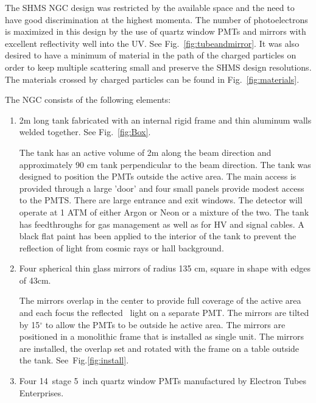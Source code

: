 {The SHMS NGC design was restricted by the available space and the need
to have good discrimination at the highest momenta.  The number of
photoelectrons is maximized in this design by the use of quartz window
PMTs and mirrors with excellent reflectivity well into the UV. See
Fig.~\ref{fig:tubeandmirror}. It was also desired to have a minimum of
material in the path of the charged particles on order to keep
multiple scattering small and preserve the SHMS design
resolutions. The materials crossed by charged particles can be found
in Fig.~\ref{fig:materials}.

\newpage
\vspace{.25in}
\vspace{.25in}

The NGC consists of the following elements:
\begin{enumerate}
\item 2m long tank fabricated with an internal rigid frame and thin
  aluminum walls welded together. See Fig.~\ref{fig:Box}.

 The tank has an active volume of 2m along the beam direction and
 approximately 90 cm tank perpendicular to the beam direction. The
 tank was designed to position the PMTs outside the active area. The
 main access is provided through a large 'door' and four small panels
 provide modest access to the PMTS. There are large entrance and exit
 windows. The detector will operate at 1 ATM of either Argon or Neon
 or a mixture of the two. The tank has feedthroughs for gas
 management as well as for HV and signal cables. A black flat paint
 has been applied to the interior of the tank to prevent the
 reflection of light from cosmic rays or hall background.

\item Four spherical thin glass mirrors of radius 135 cm, square in
  shape with edges of 43cm.

  The mirrors overlap in the center to provide full coverage of the
  active area and each focus the reflected \Cerenkov\ light on a
  separate PMT. The mirrors are tilted by 15$^\circ$ to allow the PMTs
  to be outside he active area.  The mirrors are positioned in a
  monolithic frame that is installed as single unit. The mirrors are
  installed, the overlap set and rotated with the frame on a table
  outside the tank.  See~Fig.\ref{fig:install}.
\item Four 14~stage 5~inch quartz window PMTs manufactured by Electron
  Tubes Enterprises.


\end{enumerate}}
